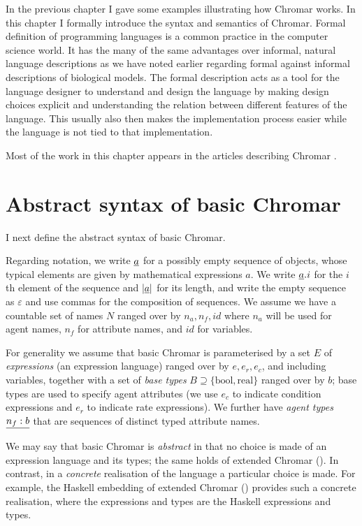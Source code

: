 In the previous chapter I gave some examples illustrating how Chromar works. In
this chapter I formally introduce the syntax and semantics of Chromar. Formal
definition of programming languages is a common practice in the computer science
world. It has the many of the same advantages over informal, natural language
descriptions as we have noted earlier regarding formal against informal
descriptions of biological models. The formal description acts as a tool for the
language designer to understand and design the language by making design choices
explicit and understanding the relation between different features of the
language. This usually also then makes the implementation process easier while
the language is not tied to that implementation.

Most of the work in this chapter appears in the articles describing Chromar
\citep{honorato-zimmer_chromar_2017, honorato-zimmer_chromar_2018}.


\section{Abstract syntax of basic Chromar}
\label{sec:syntax}
I next define the abstract syntax of basic Chromar.

Regarding notation, we write $\underline{a}$ for a possibly empty sequence of objects,
whose typical elements are given by mathematical expressions $a$. We write
$\underline{a}.i$ for the $i$th element of the sequence and $|\underline{a}|$ for its length,
and write the empty sequence as $\varepsilon$ and use commas for the composition
of sequences.  We assume we have a countable set of names $N$ ranged over by
$n_a, n_f, id$ where $n_a$ will be used for agent names, $n_f$ for attribute
names, and $id$ for variables.

For generality we assume that basic Chromar is parameterised by a set $E$ of
\emph{expressions} (an expression language) ranged over by $e, e_r, e_c$, and
including variables, together with a set of \emph{base types}
$B \supseteq \{\mathrm{bool}, \mathrm{real} \}$ ranged over by $b$; base types are used to
specify agent attributes (we use $e_c$ to indicate condition expressions and
$e_r$ to indicate rate expressions).
%
We further have \emph{agent types} $\underline{n_f:b}$ that are sequences of distinct
typed attribute names.

We may say that basic Chromar is \emph{abstract} in that no choice is made of an
expression language and its types; the same holds of extended Chromar
().  In contrast, in a \emph{concrete} realisation of the
language a particular choice is made.  For example, the Haskell embedding of
extended Chromar () provides such a concrete realisation, where
the expressions and types are the Haskell expressions and types.

